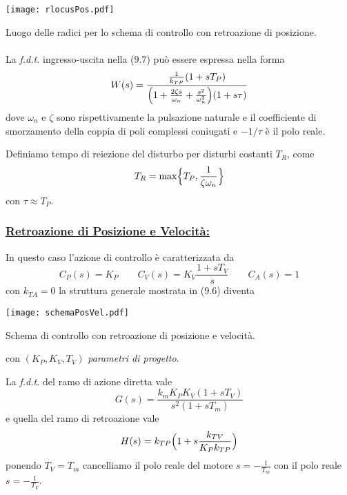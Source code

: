 \begin{center}
	\texttt{[image: rlocusPos.pdf]}
	\caption{Luogo delle radici per lo schema di controllo con retroazione di posizione.}
\end{center}

\paragraph{}
La \emph{f.d.t.} ingresso-uscita nella ($9.7$) può essere espressa nella forma
\begin{equation}
	W(s) = \frac{\frac{1}{k_{TP}} (1+sT_P)}{\Bigl( 1 + \frac{2\zeta s}{\omega_n} + \frac{s^2}{\omega_n^2} \Bigr)(1+s\tau)} 
\end{equation}
dove $\omega_n$ e $\zeta$ sono rispettivamente la pulsazione naturale e il coefficiente di smorzamento della coppia di poli complessi coniugati e $-1/\tau$ è il polo reale.

Definiamo tempo di reiezione del disturbo per disturbi costanti $T_R$, come
\begin{equation}
	T_R = \max \Bigl\lbrace T_P, \frac{1}{\zeta \omega_n} \Bigr\rbrace
\end{equation}
con $\tau \approx T_P$.

\subsubsection{\underline{Retroazione di Posizione e Velocità:}}
In questo caso l'azione di controllo è caratterizzata da 
\begin{equation*}
	C_P(s) = K_P  \qquad C_V(s) = K_V \frac{1+sT_V}{s} \qquad C_A(s) = 1 
\end{equation*}
con $k_{TA} = 0$ la struttura generale mostrata in ($9.6$) diventa
\begin{center}
	\texttt{[image: schemaPosVel.pdf]}
	\caption{Schema di controllo con retroazione di posizione e velocità.}
\end{center}
con $(K_P, K_V, T_V)$ \emph{parametri di progetto}. 

La \emph{f.d.t.} del ramo di azione diretta vale
\begin{equation}
	G(s) = \frac{k_m K_P K_V (1+sT_V)}{s^2(1+sT_m)}
\end{equation}
e quella del ramo di retroazione vale
\begin{equation}
	H(s) = k_{TP} \Bigl( 1+s\frac{k_{TV}}{K_Pk_{TP}} \Bigr)
\end{equation}
ponendo $T_V = T_m$ cancelliamo il polo reale del motore $s = -\frac{1}{T_m}$ con il polo reale $s = -\frac{1}{T_V}$.

